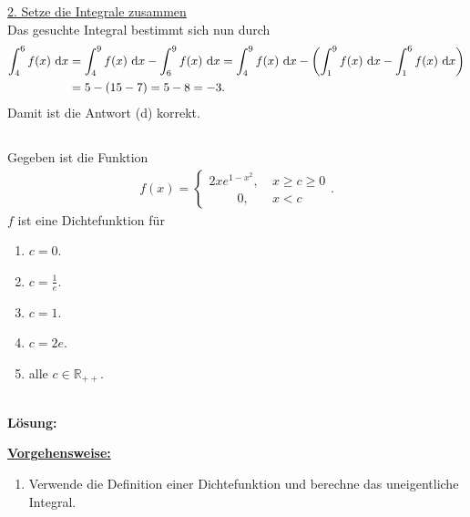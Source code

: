\underline{2. Setze die Integrale zusammen}\\
Das gesuchte Integral bestimmt sich nun durch
\begin{align*}
	\int_4^6 f(x) \ \text{\rmfamily d} x
	&=
	\int_4^9 f(x) \ \text{\rmfamily d} x
	-
	\int_6^9 f(x) \ \text{\rmfamily d} x
	=
	\int_4^9 f(x) \ \text{\rmfamily d} x
	-
	\left(
	\int_1^9 f(x) \ \text{\rmfamily d} x
	-
	\int_1^6 f(x) \ \text{\rmfamily d} x
	\right)\\
	&=
	5-(15-7)
	=
	5 - 8 = -3.
\end{align*}
Damit ist die Antwort (d) korrekt.
\newpage
\subsection*{}
Gegeben ist die Funktion
\begin{align*}
	f(x) =
	\begin{cases}
		2 x  e^{1 - x^2}, \ &x \geq c  \geq 0\\
		\qquad	\ 0 , \ &x < c
	\end{cases}.
\end{align*}
$ f $ ist eine Dichtefunktion für
\renewcommand{\labelenumi}{(\alph{enumi})}
\begin{enumerate}
	\item 
	$ c = 0 $.
	\item 
	$ c = \frac{1}{e} $.
	\item 
	$ c= 1 $.
	\item 
	$ c = 2e $.
	\item
	alle $ c \in \mathbb{R}_{++} $.
\end{enumerate}
\ \\
\textbf{Lösung:}
\begin{mdframed}
\underline{\textbf{Vorgehensweise:}}
\renewcommand{\labelenumi}{\theenumi.}
\begin{enumerate}
\item Verwende die Definition einer Dichtefunktion und berechne das uneigentliche Integral.
\end{enumerate}
\end{mdframed}

